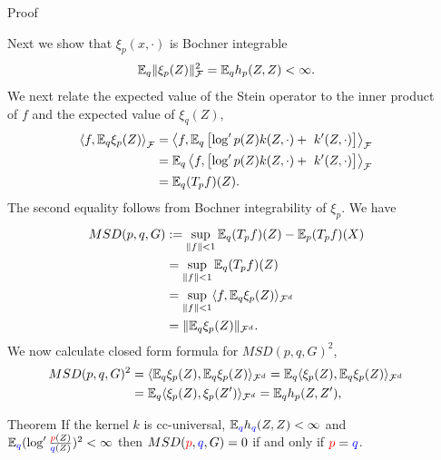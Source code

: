 \begin{frame}
\begin{columns}
\begin{column}{.33\linewidth}
 


\end{column}

\hspace{-1.45cm}
\begin{column}{.33\linewidth}

\begin{block}{Proof}

Next we show that $\xi_{p}(x,\cdot)$ is Bochner integrable
\[
\mathbb{E}_{q}\|\xi_{p}(Z)\|_{\mathcal{F}}^{2}=\mathbb{E}_{q}h_{p}(Z,Z)<\infty.
\]
We next relate the expected value of the Stein operator to the inner product of $f$ and the expected value
of $\xi_{q}(Z)$,  
\begin{align*}
  \left\langle f,\ev_{q} \xi_{p}(Z) \right\rangle _{\mathcal{F}}& =\left\langle f,\ev_{q} \left[  \log' p(Z) k(Z,\cdot)+\ k'(Z,\cdot) \right] \right \rangle _{\mathcal{F}}\\
 & = \ev_{q}  \left\langle f,\left[  \log' p(Z) k(Z,\cdot)+\ k'(Z,\cdot) \right] \right \rangle _{\mathcal{F}}\\
 & =\ev_{q}(T_{p}f)(Z).
\end{align*}
The second equality follows from  Bochner integrability of $\xi_{p}$.
We have 
\begin{align*}
MSD(p,q,G) & :=\sup_{\Vert f\Vert<1}\mathbb{E}_{q}(T_{p}f)(Z)-\mathbb{E}_{p}(T_{p}f)(X)\\
 & =\sup_{\Vert f\Vert<1}\mathbb{E}_{q}(T_{p}f)(Z)\\
 & =\sup_{\Vert f\Vert<1}\langle f,\mathbb{E}_{q}\xi_{p}(Z)\rangle_{{\cal F}^{d}}\\
 & =\|\mathbb{E}_{q}\xi_{p}(Z)\|_{\mathcal{F}^{d}}.
\end{align*}
We now calculate closed form formula for $MSD(p,q,G)^{2}$,
\begin{align*}
MSD(p,q,G)^{2} & =\langle\mathbb{E}_{q}\xi_{p}(Z),\mathbb{E}_{q}\xi_{p}(Z)\rangle_{\mathcal{F}^{d}}=\mathbb{E}_{q}\langle\xi_{p}(Z),\mathbb{E}_{q}\xi_{p}(Z)\rangle_{\mathcal{F}^{d}}\\
 & =\mathbb{E}_{q}\langle\xi_{p}(Z),\xi_{p}(Z')\rangle_{\mathcal{F}^{d}}=\mathbb{E}_{q}h_{p}(Z,Z'),
\end{align*}
\end{block}


\vspace{-0.75cm}
\begin{block}{Theorem}
\large
If the kernel $k$ is cc-universal, $\mathbb{E}_{{ \color{blue} q}} h_{{ \color{blue} q}}(Z,Z)<\infty$ and $\mathbb{E}_{{ \color{blue} q}} (\log' \frac{{\color{red} p}(Z)}{{ \color{blue} q}(Z)})^{2}<\infty$
then $MSD({\color{red} p},{ \color{blue} q},G) =0$ if and only if ${\color{red} p}={ \color{blue} q}$.


\end{block}
\end{column}
\end{columns}
\end{frame}
